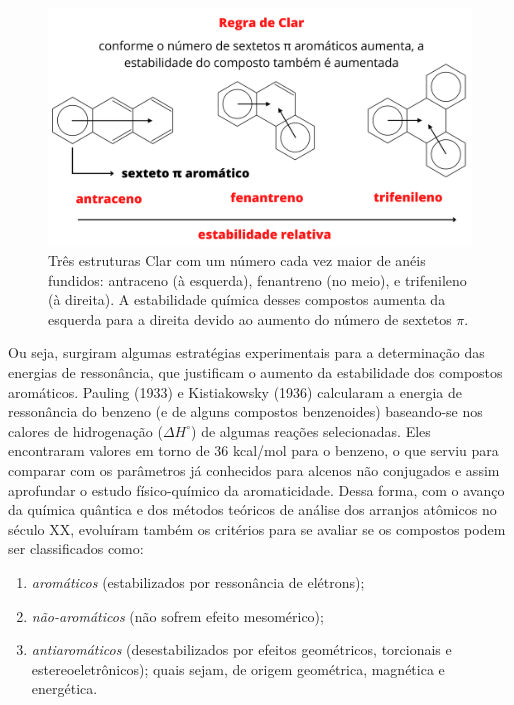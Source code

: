 \begin{figure}[htb]
	\caption{\label{fig:clar} Três estruturas Clar com um número cada vez maior de anéis fundidos: antraceno (à esquerda), fenantreno (no meio), e trifenileno (à direita). A estabilidade química desses compostos aumenta da esquerda para a direita devido ao aumento do número de sextetos $\pi$.}
	\begin{center}
		\includegraphics[width=1.0\textwidth]{images/fig2(11).png}
	\end{center}
\end{figure}




Ou seja, surgiram algumas estratégias experimentais para a determinação das energias de ressonância, que justificam o aumento da estabilidade dos compostos aromáticos. Pauling (1933) \autocite{Pauling1933, Pauling1936} e Kistiakowsky (1936) calcularam a energia de ressonância do benzeno (e de alguns compostos benzenoides) baseando-se nos calores de hidrogenação ($\Delta H^{\circ}$) de algumas reações selecionadas. Eles encontraram valores em torno de 36 kcal/mol para o benzeno, o que serviu para comparar com os parâmetros já conhecidos para alcenos não conjugados e assim aprofundar o estudo físico-químico da aromaticidade. Dessa forma, com o avanço da química quântica e dos métodos teóricos de análise dos arranjos atômicos no século XX, evoluíram também os critérios para se avaliar se os compostos podem ser classificados como:

\begin{enumerate}
    \item \textit{aromáticos} (estabilizados por ressonância de elétrons);
    \item \textit{não-aromáticos} (não sofrem efeito mesomérico);
    \item \textit{antiaromáticos} (desestabilizados por efeitos geométricos, torcionais e estereoeletrônicos); quais sejam, de origem geométrica, magnética e energética. 
\end{enumerate}

